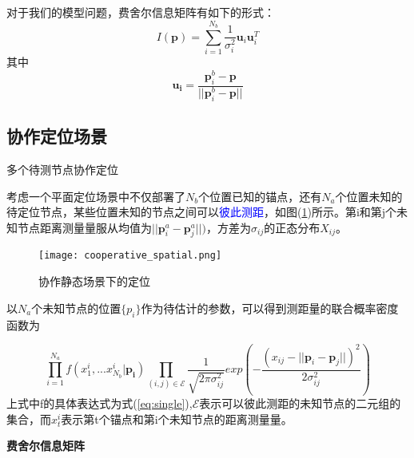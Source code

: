 对于我们的模型问题，费舍尔信息矩阵有如下的形式：
\begin{equation}\label{eq:uu}
I(\bm{p})=\displaystyle\sum_{i=1}^{N_b}\frac{1}{\sigma_i^2}\bm{u}_i\bm{u}_i^T
\end{equation}
其中
\begin{equation}
\bm{u_i}=\frac{\bm{p}^b_i-\bm{p}}{||\bm{p}^b_i-\bm{p}||}
\end{equation}


\subsection[协作定位场景]{协作定位场景}\label{subsection:cooperative_localization}

多个待测节点协作定位

考虑一个平面定位场景中不仅部署了$N_b$个位置已知的锚点，还有$N_a$个位置未知的待定位节点，某些位置未知的节点之间可以\textcolor{blue}{彼此测距}，如图(\ref{fig:cooperative_spatial})所示。第i和第j个未知节点距离测量量服从均值为$||\bm{p}^a_i-\bm{p}^a_j||)$，方差为$\sigma_{ij}$的正态分布$X_{ij}$。
        \begin{figure}
          \centering
          \texttt{[image: cooperative\_spatial.png]}
          \caption{协作静态场景下的定位}\label{fig:cooperative_spatial}
        \end{figure}

以$N_a$个未知节点的位置$\{p_i\}$作为待估计的参数，可以得到测距量的联合概率密度函数为

\begin{equation}
\prod_{i=1}^{N_a} f(x^i_1,...x^{i}_{N_b}|\bm{p_i})\prod_{(i,j)\in \mathcal{E}}\frac{1}{\sqrt{2\pi\sigma_{ij}^2}}exp(-\frac{(x_{ij}-||\bm{p}_i-\bm{p}_j||)^2}{2\sigma_{ij}^2})
\end{equation}
上式中f的具体表达式为式(\ref{eq:single}),$\mathcal{E}$表示可以彼此测距的未知节点的二元组的集合，而$x_t^i$表示第t个锚点和第i个未知节点的距离测量量。

\textbf{费舍尔信息矩阵}

